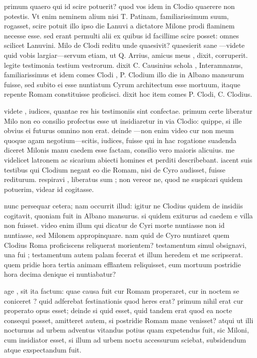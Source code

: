  primum quaero qui id scire potuerit? quod vos idem in Clodio quaerere non potestis. Vt enim neminem alium nisi T. Patinam, familiarissimum suum, rogasset, scire potuit illo ipso die Lanuvi a dictatore Milone prodi flaminem necesse esse. sed erant permulti alii ex quibus id facillime scire posset: omnes scilicet Lanuvini. Milo de Clodi reditu unde quaesivit? quaesierit sane —videte quid vobis largiar—servum etiam, ut Q. Arrius, amicus meus , dixit, corruperit. legite testimonia testium vestrorum. dixit C. Causinius schola , Interamnanus, familiarissimus et idem comes Clodi , P. Clodium illo die in Albano mansurum fuisse, sed subito ei esse nuntiatum Cyrum architectum esse mortuum, itaque repente Romam constituisse proficisci. dixit hoc item comes P. Clodi, C. Clodius.

 videte , iudices, quantae res his testimoniis sint confectae. primum certe liberatur Milo non eo consilio profectus esse ut insidiaretur in via Clodio: quippe, si ille obvius ei futurus omnino non erat. deinde —non enim video cur non meum quoque agam negotium—scitis, iudices, fuisse qui in hac rogatione suadenda diceret Milonis manu caedem esse factam, consilio vero maioris alicuius. me videlicet latronem ac sicarium abiecti homines et perditi describebant. iacent suis testibus qui Clodium negant eo die Romam, nisi de Cyro audisset, fuisse rediturum. respiravi , liberatus sum ; non vereor ne, quod ne suspicari quidem potuerim, videar id cogitasse.

 nunc persequar cetera; nam occurrit illud: igitur ne Clodius quidem de insidiis cogitavit, quoniam fuit in Albano mansurus. si quidem exiturus ad caedem e villa non fuisset. video enim illum qui dicatur de Cyri morte nuntiasse non id nuntiasse, sed Milonem appropinquare. nam quid de Cyro nuntiaret quem Clodius Roma proficiscens reliquerat morientem? testamentum simul obsignavi, una fui ; testamentum autem palam fecerat et illum heredem et me scripserat. quem pridie hora tertia animam efflantem reliquisset, eum mortuum postridie hora decima denique ei nuntiabatur?

 age , sit ita factum: quae causa fuit cur Romam properaret, cur in noctem se coniceret ? quid adferebat festinationis quod heres erat? primum nihil erat cur properato opus esset; deinde si quid esset, quid tandem erat quod ea nocte consequi posset, amitteret autem, si postridie Romam mane venisset? atqui ut illi nocturnus ad urbem adventus vitandus potius quam expetendus fuit, sic Miloni, cum insidiator esset, si illum ad urbem noctu accessurum sciebat, subsidendum atque exspectandum fuit.

